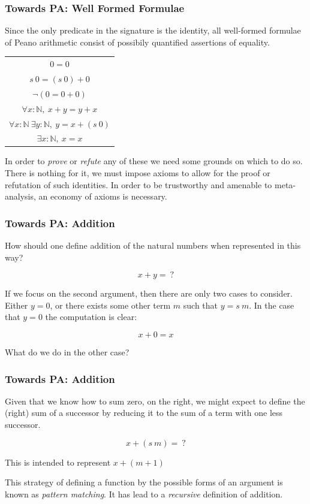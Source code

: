 \documentclass{beamer}
\theoremstyle{indentDefn} \newtheorem{defn}[]{Definition}
\begin{document}
\begin{frame}
	\frametitle{Towards PA: Well Formed Formulae}

	Since the only predicate in the signature is the identity, all well-formed formulae of Peano arithmetic consist of possibily quantified assertions of equality. 

	\begin{center}
		\begin{tabular}{c}
			$0 = 0$ \\
			$s \ 0 = (s \ 0) + 0$ \\
			$\lnot (0 = 0 + 0)$ \\
			$\forall x : \mathbb{N}, \ x + y = y + x$ \\
			$\forall x : \mathbb{N} \ \exists y : \mathbb{N}, \ y = x + (s \ 0)$ \\
			$\exists x : \mathbb{N}, \ x = x$
		\end{tabular}
	\end{center}

	In order to \emph{prove} or \emph{refute} any of these we need some grounds on which to do so. There is nothing for it, we must impose axioms to allow for the proof or refutation of such identities. In order to be trustworthy and amenable to meta-analysis, an economy of axioms is necessary. 

\end{frame}

\begin{frame}
	\frametitle{Towards PA: Addition}
	How should one define addition of the natural numbers when represented in this way? 

	$$ x + y =  \ ?$$

	If we focus on the second argument, then there are only two cases to consider. Either $y = 0$, or there exists some other term $m$ such that $y = s \ m$. In the case that $y = 0$ the computation is clear: 

	$$x + 0 = x$$

	What do we do in the other case? 


\end{frame}

\begin{frame}
	\frametitle{Towards PA: Addition}

	Given that we know how to sum zero, on the right, we might expect to define the (right) sum of a successor by reducing it to the sum of a term with one less successor. 

	$$ x + (s \ m) =  \ ?$$

	This is intended to represent $x + (m + 1)$

	\vspace{25mm}

	This strategy of defining a function by the possible forms of an argument is known as \emph{pattern matching}. It has lead to a \emph{recursive} definition of addition.
\end{frame}
\end{document}
